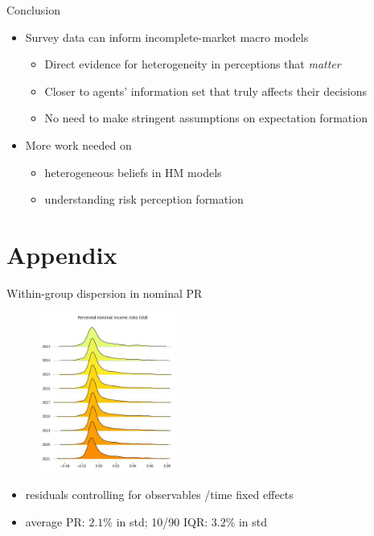 \documentclass{beamer}
\begin{document}
\begin{frame}{Conclusion}
	
	\begin{itemize}
 	\item Survey data can inform incomplete-market macro models 
 	\begin{itemize}
 		\item Direct evidence for heterogeneity in perceptions that \textit{matter}
 		\item Closer to agents' information set that truly affects their decisions
 			\item No need to make stringent assumptions on expectation formation
 	\end{itemize}

	\item More work needed on 
	\begin{itemize}
		\item heterogeneous beliefs in HM models
		\item understanding risk perception formation  
	\end{itemize}
	\end{itemize}
\end{frame}





\section*{Appendix}



\begin{frame}{Within-group dispersion in nominal PR}
	\label{appendix:incstd}
	\begin{figure}
		\centering
		\includegraphics[width=0.4\textwidth]{figures/joy_incstd.jpg}
	\end{figure}
	\begin{itemize}
		\item  residuals controlling for observables /time fixed effects
		\item average PR:  $2.1\%$ in std; 10/90 IQR: $3.2\%$ in std \quad \hyperlink{rincstd_hist}{}    
	\end{itemize}
\end{frame}
\end{document}
